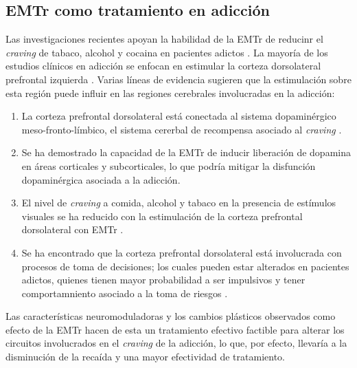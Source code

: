 \subsection{EMTr como tratamiento en adicción}
Las investigaciones recientes apoyan la habilidad de la EMTr de reducinr el \textit{craving} de tabaco, alcohol y cocaina en pacientes adictos \parencite{Barr2011}.
La mayoría de los estudios clínicos en adicción se enfocan en estimular la corteza dorsolateral prefrontal izquierda \parencite{Bellamoli2014a,Barr2011,Ekhtiari2019}.
Varias líneas de evidencia sugieren que la estimulación sobre esta región puede influir en las regiones cerebrales involucradas en la adicción:
\begin{enumerate}
    \item La corteza prefrontal dorsolateral está conectada al sistema dopaminérgico meso-fronto-límbico, el sistema cererbal de recompensa asociado al \textit{craving} \parencite{Barr2011}.
    \item Se ha demostrado la capacidad de la EMTr de inducir liberación de dopamina en áreas corticales y subcorticales\parencite{Cho2009,Strafella2001}, lo que podría mitigar la disfunción dopaminérgica asociada a la adicción.
    \item El nivel de \textit{craving} a comida, alcohol y tabaco en la presencia de estímulos visuales se ha reducido con la estimulación de la corteza prefrontal dorsolateral con EMTr \parencite{Amiaz2009}.
    \item Se ha encontrado que la corteza prefrontal dorsolateral está involucrada con procesos de toma de decisiones; los cuales pueden estar alterados en pacientes adictos, quienes tienen mayor probabilidad a ser impulsivos y tener comportamniento asociado a la toma de riesgos \parencite{Barr2011}.
\end{enumerate}
Las características neuromoduladoras y los cambios plásticos observados como efecto de la EMTr hacen de esta un tratamiento efectivo factible para alterar los circuitos involucrados en el \textit{craving} de la adicción, lo que, por efecto, llevaría a la disminución de la recaída y una mayor efectividad de tratamiento.

